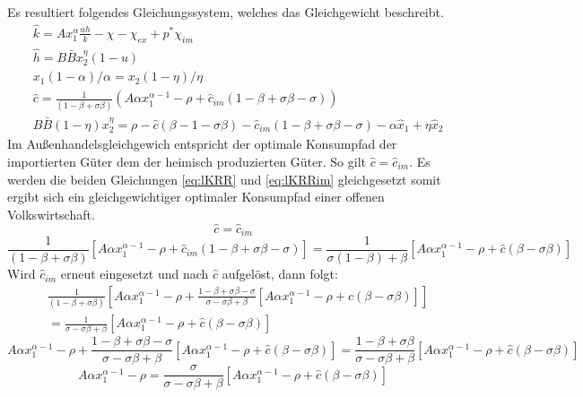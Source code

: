 Es resultiert folgendes Gleichungssystem, welches das Gleichgewicht beschreibt. 
\begin{align}
&\hat{k}=Ax_1^\alpha \frac{uh}{k}-\chi-\chi_{ex}+p^*\chi_{im}\label{GG1}\\
&\hat{h}=B\bar{B}x_2^\eta(1-u)\label{GG2}\\
& x_1(1-\alpha)/\alpha =x_2(1-\eta)/\eta\label{GG3}\\
&\hat{c}=\frac{1}{(1-\beta+\sigma\beta)}\left(A\alpha x_1^{\alpha -1}-\rho+\hat{c}_{im}(1-\beta+\sigma\beta-\sigma)\right)\label{GG4}\\
&B\bar{B}(1-\eta)x_2^\eta=\rho-\hat{c}(\beta-1-\sigma\beta)-\hat{c}_{im}(1-\beta+\sigma\beta-\sigma)-\alpha\hat{x}_1+\eta\hat{x}_2\label{GG5}
\end{align}
Im Au{\ss}enhandelsgleichgewich entspricht der optimale Konsumpfad der importierten Güter  dem der heimisch produzierten Güter. So gilt $\hat{c}=\hat{c}_{im}$. Es werden die beiden Gleichungen  \eqref{eq:lKRR} und \eqref{eq:lKRRim} gleichgesetzt somit ergibt sich ein gleichgewichtiger optimaler Konsumpfad einer offenen Volkswirtschaft. 
\begin{equation*}
\hat{c}=\hat{c}_{im}
\end{equation*}
\begin{equation}
\frac{1}{(1-\beta+\sigma\beta)}[A\alpha x_1^{\alpha-1}-\rho+\hat{c}_{im}(1-\beta+\sigma\beta-\sigma)]=\frac{1}{\sigma(1-\beta)+\beta}[A\alpha x_1^{\alpha-1}-\rho+\hat{c}(\beta-\sigma\beta)]
\end{equation}
Wird $\hat{c}_{im}$ erneut eingesetzt und  nach $\hat{c}$ aufgelöst, dann folgt: 
\begin{equation*}
\begin{split}
&\frac{1}{(1-\beta+\sigma\beta)}\left[A\alpha x_1^{\alpha-1}-\rho+\frac{1-\beta+\sigma\beta-\sigma}{\sigma-\sigma\beta+\beta}[A\alpha x_1^{\alpha-1}-\rho+\hat{c}(\beta-\sigma\beta)]\right]\\
& =\frac{1}{\sigma-\sigma\beta+\beta}[A\alpha x_1^{\alpha-1}-\rho+\hat{c}(\beta-\sigma\beta)]
\end{split}
\end{equation*}
\begin{equation*}
A\alpha x_1^{\alpha-1}-\rho+\frac{1-\beta+\sigma\beta-\sigma}{\sigma-\sigma\beta+\beta}[A\alpha x_1^{\alpha-1}-\rho+\hat{c}(\beta-\sigma\beta)]=\frac{1-\beta+\sigma\beta}{\sigma-\sigma\beta+\beta}[A\alpha x_1^{\alpha-1}-\rho+\hat{c}(\beta-\sigma\beta)]
\end{equation*}
\begin{equation*}
A\alpha x_1^{\alpha-1}-\rho=\frac{\sigma}{\sigma-\sigma\beta+\beta}[A\alpha x_1^{\alpha-1}-\rho+\hat{c}(\beta-\sigma\beta)]
\end{equation*}
